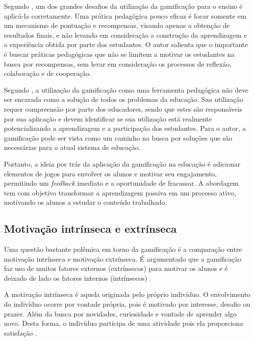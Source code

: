 \documentclass[
	12pt,				%
	oneside,			%
	a4paper,			%
	english,			%
	french,				%
	spanish,			%
	brazil,				%
	]{abntex2}
\begin{document}
Segundo \citet{fardo2013gamificaccao}, um dos grandes desafios da utilização da gamificação para o ensino é aplicá-la corretamente. Uma prática pedagógica pouco eficaz é focar somente em um mecanismo de pontuação e recompensas, visando apenas a obtenção de resultados finais, e não levando em consideração a construção da aprendizagem e a experiência obtida por parte dos estudantes. O autor salienta que o importante é buscar práticas pedagógicas que não se limitem a motivar os estudantes na busca por recompensas, sem levar em consideração os processos de reflexão, colaboração e de cooperação.

Segundo \citet{fardo2013gamificaccao}, a utilização da gamificação como uma ferramenta pedagógica não deve ser encarada como a solução de todos os problemas da educação. Sua utilização requer compreensão por parte dos educadores, sendo que estes são responsáveis por sua aplicação e devem identificar se sua utilização está realmente potencializando a aprendizagem e a participação dos estudantes. Para o autor, a gamificação pode ser vista como um caminho na busca por soluções que são necessárias para o atual sistema de educação.

Portanto, a ideia por trás da aplicação da gamificação na educação é adicionar elementos de jogos para envolver os alunos e motivar seu engajamento, permitindo um \textit{feedback} imediato e a oportunidade de fracassar. A abordagem tem com objetivo transformar a aprendizagem passiva em um processo ativo, motivando os alunos a estudar o conteúdo trabalhado.

\subsection{Motivação intrínseca e extrínseca}

Uma questão bastante polêmica em torno da gamificação é a comparação entre motivação intrínseca e motivação extrínseca. É argumentado que a gamificação faz uso de muitos fatores externos (extrínsecos) para motivar os alunos e é deixado de lado os fatores internos (intrínsecos) \cite{fardo2013gamificaccao}.

A motivação intrínseca é aquela originada pelo próprio indivíduo. O envolvimento do indivíduo ocorre por vontade própria,  pois é motivado por interesse, desafio ou prazer. Além da busca por novidades, curiosidade e vontade de aprender algo novo. Desta forma, o indivíduo participa de uma atividade pois ela proporciona satisfação \cite{busarello2016gamificaccao}.
\end{document}
